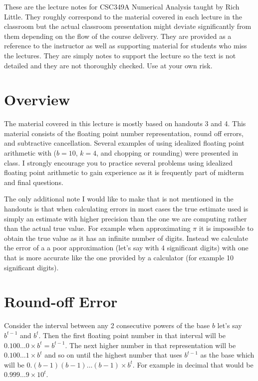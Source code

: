 \documentclass [titlepage,12pt,letter] {article}
\begin{document}
 


These are the lecture notes for CSC349A Numerical Analysis taught by
Rich Little. They roughly correspond to
the material covered in each lecture in the classroom but the actual
classroom presentation might deviate significantly from them depending
on the flow of the course delivery. They are provided as a reference to
the instructor as well as supporting material for students who miss
the lectures. They are simply notes to support the lecture so the text
is not detailed and they are not thoroughly checked. Use at your own
risk. 

\section{Overview} 


The material covered in this lecture is mostly based on handouts 3 and
4.  This material consists of the floating point number
representation, round off errors, and subtractive
cancellation. Several examples of using idealized floating point
arithmetic with ($b=10$, $k=4$, and chopping or rounding) were presented
in class. I strongly encourage you to practice several problems using
idealized floating point arithmetic to gain experience as it is
frequently part of midterm and final questions.

The only additional note I would like to make that is not mentioned in
the handouts is that when calculating errors in most cases the true
estimate used is simply an estimate with higher precision than the one
we are computing rather than the actual true value. For example when
approximating $\pi$ it is impossible to obtain the true value as it
has an infinite number of digits. Instead we calculate the error of a
a poor approximation (let's say with 4 significant digits) with one
that is more accurate like the one provided by a calculator (for
example 10 significant digits).

\section{Round-off Error}

Consider the interval between any 2 consecutive powers of the base $b$ let's say $b^{t-1}$ and $b^{t}$. Then the first floating point number in that interval will be $0.100\dots0 \times b^t=b^{t-1}$. The next higher number in that representation will be $0.100\dots1 \times b^t$ and so on until the highest number that uses $b^{t-1}$ as the base which will be $0.(b-1)(b-1)\dots(b-1)\times b^t$. For example in decimal that would be $0.999\dots9 \times 10^t$. 
\end{document}
